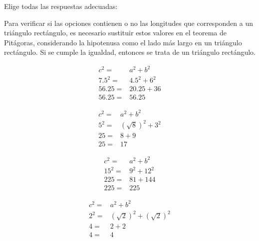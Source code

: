 Elige todas las respuestas adecuadas:
\begin{solutionbox}{6cm}
    Para verificar si las opciones contienen o no las longitudes que corresponden a un triángulo rectángulo, es necesario sustituir estos valores en el teorema de Pitágoras, considerando la hipotenusa como el lado más largo en un triángulo rectángulo. Si se cumple la igualdad, entonces se trata de un triángulo rectángulo.

    \begin{multicols}{4}
        \begin{align*}
            c^2=  & a^2+b^2  \\
            7.5^2= & 4.5^2+6^2 \\
            56.25= & 20.25+36 \\
            56.25= & 56.25
        \end{align*}

        \begin{align*}
            c^2=  & a^2+b^2  \\
           5^2 = & (\sqrt{8})^2 + 3^2 \\
            25=  & 8+9   \\
            25=  & 17
        \end{align*}

        \begin{align*}
            c^2=  & a^2+b^2  \\
            15^2= & 9^2+12^2 \\
            225=  & 81+144   \\
            225=  & 225
        \end{align*}
        
        \begin{align*}
            c^2= & a^2+b^2 \\
            2^2= & (\sqrt{2})^2+ (\sqrt{2})^2 \\
            4=  & 2+2   \\
            4=  & 4
        \end{align*}
    \end{multicols}
\end{solutionbox}